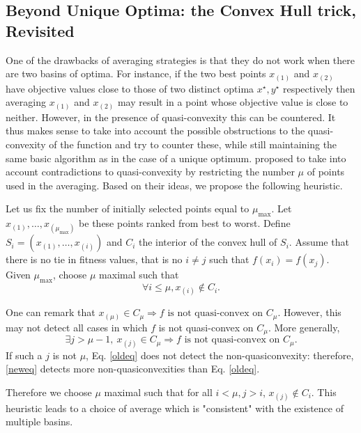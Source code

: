 \subsection{Beyond Unique Optima: the Convex Hull trick, Revisited}\label{nonqc}

One of the drawbacks of averaging strategies is that they do not work when there are two basins of optima. For instance, if the two best points $x_{(1)}$ and $x_{(2)}$ have objective values close to those of two distinct optima $x^{\star},y^{\star}$ respectively then averaging $x_{(1)}$ and $x_{(2)}$ may result in a point whose objective value is close to neither. However, in the presence of quasi-convexity this can be countered. It thus makes sense to take into account the possible obstructions to the quasi-convexity of the function and try to counter these, while still maintaining the same basic algorithm as in the case of a unique optimum. \cite{ppsnkbest} proposed to take into account contradictions to quasi-convexity by restricting the number $\mu$ of points used in the averaging. Based on their ideas, we propose the following heuristic.

Let us fix the number of initially selected  points equal to $\mu_{\max}$. Let $x_{(1)},\dots,x_{(\mu_{\max})}$ be these points ranked from best to worst. Define $S_i=(x_{(1)},\dots,x_{(i)})$ and $C_i$ the interior of the convex hull of $S_i$. Assume that there is no tie in fitness values, that is no $i\neq j$ such that $f(x_{i})=f(x_{j})$. Given $\mu_{\max}$, choose $\mu$ maximal such that
\begin{equation}\forall i\leq \mu, x_{(i)} \not \in C_i.\label{oldeq}\end{equation}

One can remark that
$x_{(\mu)}\in C_\mu\Rightarrow f\mbox{ is not quasi-convex on }C_\mu$. However, this may not detect all cases in which $f$ is not quasi-convex on $C_\mu$. More generally,
\begin{equation}\exists j > \mu-1,\ x_{(j)}\in C_\mu \Rightarrow f \mbox{ is not quasi-convex on }C_\mu.\label{neweq}\end{equation} 
If such a $j$ is not $\mu$, Eq. \eqref{oldeq} does not detect the non-quasiconvexity: therefore, \eqref{neweq} detects more non-quasiconvexities than Eq. \eqref{oldeq}.

Therefore we choose $\mu$ maximal such that for all $i<\mu, j>i$, $x_{(j)}\not\in C_i$. This heuristic leads to a choice of average which is "consistent" with the existence of multiple basins.
